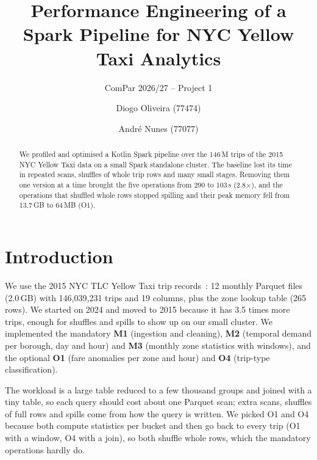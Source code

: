 \documentclass[sigconf]{acmart}
\begin{document}
\title{Performance Engineering of a Spark Pipeline for NYC Yellow Taxi Analytics}
\subtitle{ComPar 2026/27 -- Project 1}


\author{Diogo Oliveira (77474)}
\author{Andr\'e Nunes (77077)}


\begin{abstract}
We profiled and optimised a Kotlin Spark pipeline over the 146\,M trips of the 2015 NYC Yellow Taxi data on a small Spark
standalone cluster. The baseline lost its time in repeated scans, shuffles of whole trip rows and many small stages. Removing
them one version at a time brought the five operations from 290 to 103\,s (2.8$\times$), and the operations that shuffled whole
rows stopped spilling and their peak memory fell from 13.7\,GB to 64\,MB (O1).
\end{abstract}



\maketitle
\pagestyle{plain} %

\section{Introduction}
We use the 2015 NYC TLC Yellow Taxi trip records~\cite{tlc}: 12 monthly Parquet files (2.0\,GB) with 146{,}039{,}231 trips
and 19 columns, plus the zone lookup table (265 rows). We started on 2024 and moved to 2015 because it has 3.5 times more
trips, enough for shuffles and spills to show up on our small cluster. We implemented the mandatory \textbf{M1} (ingestion and
cleaning), \textbf{M2} (temporal demand per borough, day and hour) and \textbf{M3} (monthly zone statistics with windows), and
the optional \textbf{O1} (fare anomalies per zone and hour) and \textbf{O4} (trip-type classification).

The workload is a large table reduced to a few thousand groups and joined with a tiny table, so each query should cost about
one Parquet scan; extra scans, shuffles of full rows and spills come from how the query is written. We picked O1 and O4
because both compute statistics per bucket and then go back to every trip (O1 with a window, O4 with a join), so both shuffle
whole rows, which the mandatory operations hardly do.
\end{document}
